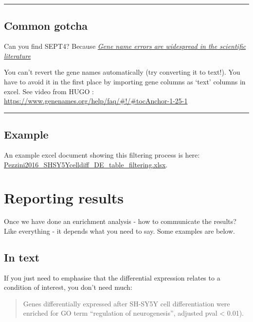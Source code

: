 \documentclass[
]{book}
\begin{document}
\begin{center}\rule{0.5\linewidth}{0.5pt}\end{center}

\section{Common gotcha}\label{common-gotcha}

Can you find SEPT4? Because \href{https://genomebiology.biomedcentral.com/articles/10.1186/s13059-016-1044-7}{\emph{Gene name errors are widespread in the scientific literature}}

You can't revert the gene names automatically (try converting it to text!). You have to avoid it in the first place by importing gene columns as `text' columns in excel. See video from HUGO : \url{https://www.genenames.org/help/faq/\#!/\#tocAnchor-1-25-1}

\begin{center}\rule{0.5\linewidth}{0.5pt}\end{center}

\section{Example}\label{example}

An example excel document showing this filtering process is here: \href{https://monashbioinformaticsplatform.github.io/enrichment_analysis_workshop/data/Pezzini2016_SHSY5Ycelldiff_DE_table_filtering.xlsx}{Pezzini2016\_SHSY5Ycelldiff\_DE\_table\_filtering.xlsx}.

\chapter{Reporting results}\label{reporting-results}

Once we have done an enrichment analysis - how to communicate the results? Like everything - it depends what you need to say. Some examples are below.

\section{In text}\label{in-text}

If you just need to emphasise that the differential expression relates to a condition of interest, you don't need much:

\begin{quote}
Genes differentially expressed after SH-SY5Y cell differentiation were enriched for GO term ``regulation of neurogenesis'', adjusted pval \textless{} 0.01).
\end{quote}
\end{document}
